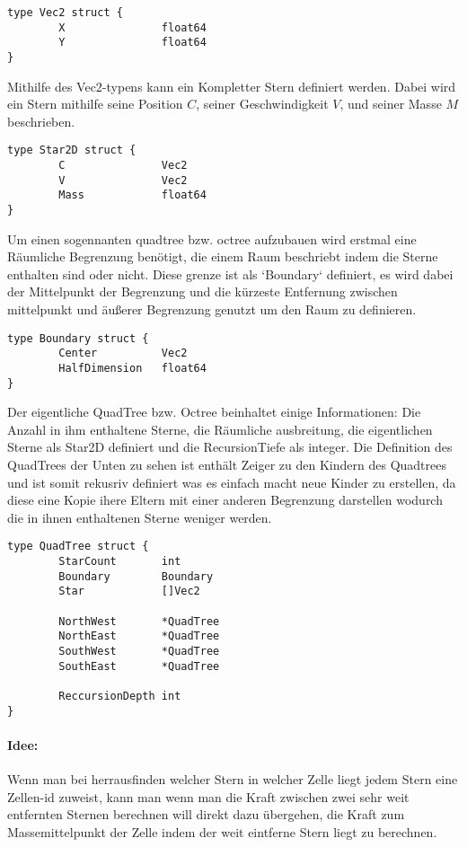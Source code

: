 \documentclass[a4paper, 10pt]{article}
\begin{document}
\begin{multicols*}{2}
\begin{lstlisting}
type Vec2 struct {
        X               float64 
        Y               float64 
}
\end{lstlisting}

Mithilfe des Vec2-typens kann ein Kompletter Stern definiert werden. Dabei wird
ein Stern mithilfe seine Position \( C \), seiner Geschwindigkeit \( V \), und
seiner Masse \( M \) beschrieben. 

\begin{lstlisting}
type Star2D struct {
        C               Vec2 
        V               Vec2 
        Mass            float64
}
\end{lstlisting}

Um einen sogennanten quadtree bzw. octree aufzubauen wird erstmal eine
Räumliche Begrenzung benötigt, die einem Raum beschriebt indem die Sterne
enthalten sind oder nicht.  Diese grenze ist als `Boundary` definiert, es wird
dabei der Mittelpunkt der Begrenzung und die kürzeste Entfernung zwischen
mittelpunkt und äußerer Begrenzung genutzt um den Raum zu definieren.

\begin{lstlisting}
type Boundary struct {
        Center          Vec2 
        HalfDimension   float64 
}
\end{lstlisting}

Der eigentliche QuadTree bzw. Octree beinhaltet einige Informationen: Die
Anzahl in ihm enthaltene Sterne, die Räumliche ausbreitung, die eigentlichen
Sterne als Star2D definiert und die RecursionTiefe als integer.  Die Definition
des QuadTrees der Unten zu sehen ist enthält Zeiger zu den Kindern des
Quadtrees und ist somit rekusriv definiert was es einfach macht neue Kinder zu
erstellen, da diese eine Kopie ihere Eltern mit einer anderen Begrenzung
darstellen wodurch die in ihnen enthaltenen Sterne weniger werden.

\begin{lstlisting}
type QuadTree struct {
        StarCount       int 
        Boundary        Boundary 
        Star            []Vec2 

        NorthWest       *QuadTree
        NorthEast       *QuadTree
        SouthWest       *QuadTree
        SouthEast       *QuadTree

        ReccursionDepth int
}
\end{lstlisting}

\paragraph{Idee:}
Wenn man bei herrausfinden welcher Stern in welcher Zelle liegt jedem Stern
eine Zellen-id zuweist, kann man wenn man die Kraft zwischen zwei sehr weit
entfernten Sternen berechnen will direkt dazu übergehen, die Kraft zum
Massemittelpunkt der Zelle indem der weit eintferne Stern liegt zu berechnen.


\end{multicols*}
\end{document}
